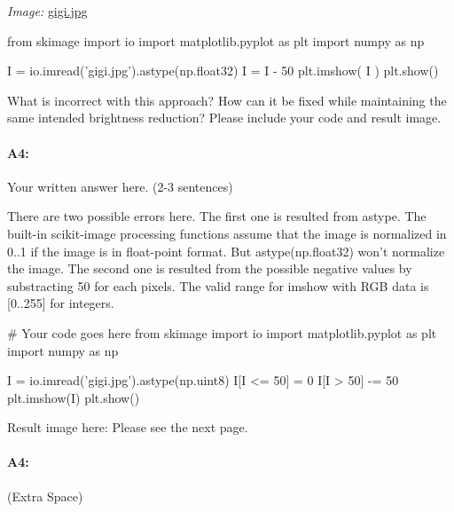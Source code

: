 \documentclass[11pt]{article}
\begin{document}
\emph{Image:} \href{gigi.jpg}{gigi.jpg}

\begin{python}
from skimage import io
import matplotlib.pyplot as plt
import numpy as np

I =  io.imread('gigi.jpg').astype(np.float32)
I = I - 50
plt.imshow( I )
plt.show()
\end{python}

What is incorrect with this approach? How can it be fixed while maintaining the same intended brightness reduction? Please include your code and result image.

\paragraph{A4:} Your written answer here. (2-3 sentences)

There are two possible errors here. The first one is resulted from astype. The built-in scikit-image processing functions assume that the image is normalized in 0..1 if the image is in float-point format. But astype(np.float32) won't normalize the image. The second one is resulted from the possible negative values by substracting 50 for each pixels. The valid range for imshow with RGB data is [0..255] for integers.

\begin{python}
# Your code goes here
from skimage import io
import matplotlib.pyplot as plt
import numpy as np

I =  io.imread('gigi.jpg').astype(np.uint8)
I[I <= 50] = 0
I[I > 50] -= 50
plt.imshow(I)
plt.show()
\end{python}

Result image here: Please see the next page.

\pagebreak
\paragraph{A4:} (Extra Space)
\end{document}
